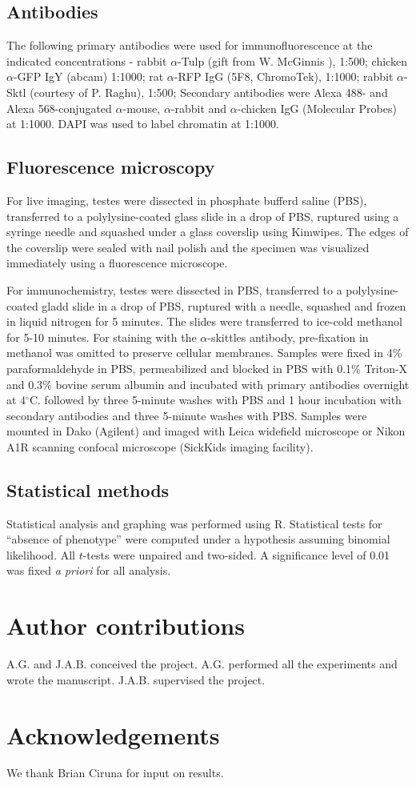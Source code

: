 \documentclass[12pt, twoside, letterpaper]{article}
\begin{document}
\subsection{Antibodies}
The following primary antibodies were used for immunofluorescence
at the indicated concentrations - 
rabbit $\alpha$-Tulp (gift from W. McGinnis \citep{ronshaugen2002structure}), 1:500; 
chicken $\alpha$-GFP IgY (abcam) 1:1000;
rat $\alpha$-RFP IgG (5F8, ChromoTek), 1:1000;
rabbit $\alpha$-Sktl (courtesy of P. Raghu), 1:500;
Secondary antibodies were Alexa 488- and Alexa 568-conjugated
$\alpha$-mouse, $\alpha$-rabbit and $\alpha$-chicken
IgG (Molecular Probes) at 1:1000.
DAPI was used to label chromatin at 1:1000.

\subsection{Fluorescence microscopy}
For live imaging, testes were dissected in phosphate bufferd saline (PBS),
transferred to a polylysine-coated glass slide in a drop of PBS,
ruptured using a syringe needle and
squashed under a glass coverslip using Kimwipes.
The edges of the coverslip were sealed with nail polish
and the specimen was visualized immediately using a fluorescence microscope.

For immunochemistry, testes were dissected in PBS,
transferred to a polylysine-coated gladd slide in a drop of PBS,
ruptured with a needle, squashed and frozen in liquid nitrogen for 5 minutes.
The slides were transferred to ice-cold methanol for 5-10 minutes.
For staining with the $\alpha$-skittles antibody, pre-fixation in methanol
was omitted to preserve cellular membranes.
Samples were fixed in 4\% paraformaldehyde in PBS,
permeabilized and blocked in PBS with 0.1\% Triton-X and 0.3\% bovine
serum albumin and incubated with primary antibodies overnight at 4$^{\circ}$C.
followed by three 5-minute washes with PBS and 1 hour incubation
with secondary antibodies and three 5-minute washes with PBS.
Samples were mounted in Dako (Agilent) and imaged with Leica widefield microscope
or Nikon A1R scanning confocal microscope (SickKids imaging facility).

\subsection{Statistical methods}
Statistical analysis and graphing was performed using R.
Statistical tests for ``absence of phenotype'' were computed under a
hypothesis assuming binomial likelihood.
All $t$-tests were unpaired and two-sided.
A significance level of 0.01 was fixed \textit{a priori} for all analysis.

\section{Author contributions}
A.G. and J.A.B. conceived the project.
A.G. performed all the experiments and wrote the manuscript.
J.A.B. supervised the project.


\section{Acknowledgements}
We thank Brian Ciruna for input on results.


\end{document}
